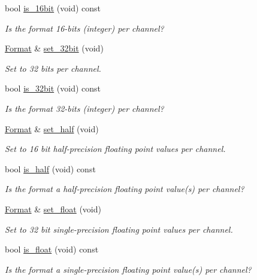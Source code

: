 \begin{DoxyCompactItemize}
bool \hyperlink{class_c_m_s_1_1_format_a67bef287285ae9a4d24d0e27ff5724e4}{is\+\_\+16bit} (void) const
\begin{DoxyCompactList}\small\item\em Is the format 16-\/bits (integer) per channel? \end{DoxyCompactList}\item 
\hyperlink{class_c_m_s_1_1_format}{Format} \& \hyperlink{class_c_m_s_1_1_format_a8f3b1fedf1936518da6d9f2d33ff33be}{set\+\_\+32bit} (void)
\begin{DoxyCompactList}\small\item\em Set to 32 bits per channel. \end{DoxyCompactList}\item 
bool \hyperlink{class_c_m_s_1_1_format_af049f60718fb989459f8f6831a6b7213}{is\+\_\+32bit} (void) const
\begin{DoxyCompactList}\small\item\em Is the format 32-\/bits (integer) per channel? \end{DoxyCompactList}\item 
\hyperlink{class_c_m_s_1_1_format}{Format} \& \hyperlink{class_c_m_s_1_1_format_ad1cb544068caa54e3bcec68aa2854917}{set\+\_\+half} (void)
\begin{DoxyCompactList}\small\item\em Set to 16 bit half-\/precision floating point values per channel. \end{DoxyCompactList}\item 
bool \hyperlink{class_c_m_s_1_1_format_a5152df021f1e44e61c396e8463a94d16}{is\+\_\+half} (void) const
\begin{DoxyCompactList}\small\item\em Is the format a half-\/precision floating point value(s) per channel? \end{DoxyCompactList}\item 
\hyperlink{class_c_m_s_1_1_format}{Format} \& \hyperlink{class_c_m_s_1_1_format_a22296c4caae182bf7a83e313e5665cab}{set\+\_\+float} (void)
\begin{DoxyCompactList}\small\item\em Set to 32 bit single-\/precision floating point values per channel. \end{DoxyCompactList}\item 
bool \hyperlink{class_c_m_s_1_1_format_afac9e92aa35a0f3e6cbaf88a42c15227}{is\+\_\+float} (void) const
\begin{DoxyCompactList}\small\item\em Is the format a single-\/precision floating point value(s) per channel? \end{DoxyCompactList}\item 

\end{DoxyCompactItemize}
